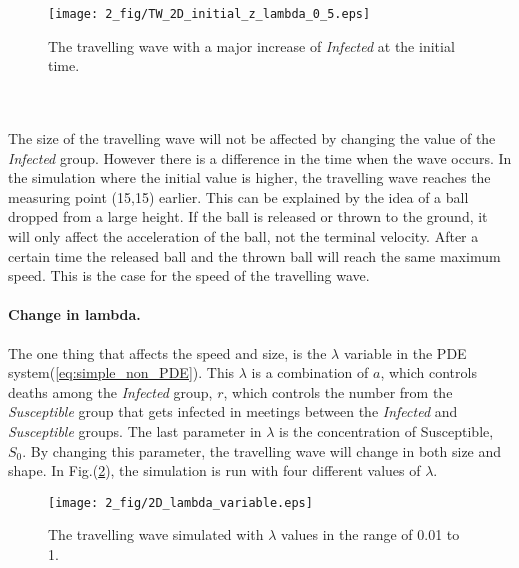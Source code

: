 \documentclass[%
twoside,                 %
final,                   %
chapterprefix=true,      %
open=right               %
10pt]{book}
\begin{document}
\begin{figure}[ht]
  \centerline{\texttt{[image: 2\_fig/TW\_2D\_initial\_z\_lambda\_0\_5.eps]}}
  \caption{
  \label{fig:initial_trav_wave} The travelling wave with a major increase of \emph{Infected} at the initial time.
  }
\end{figure}


\\
\\
The size of the travelling  wave will not be affected by changing the value of the \emph{Infected} group. However there is a difference in the time when the wave occurs. In the simulation where the initial value is higher, the travelling wave reaches the measuring point (15,15) earlier. This can be explained by the idea of a ball dropped from a large height. If the ball is released or thrown to the ground, it will only affect the acceleration of the ball, not the terminal velocity. After a certain time the released ball and the thrown ball will reach the same maximum speed. This is the case for the speed of the travelling wave. 
\paragraph{Change in lambda.}
The one thing that affects the speed and size, is the $\lambda$ variable in the PDE system(\ref{eq:simple_non_PDE}). This $\lambda$ is a combination of $a$, which controls deaths among the \emph{Infected} group, $r$, which controls the number from the \emph{Susceptible} group that gets infected in meetings between the \emph{Infected} and \emph{Susceptible} groups. The last parameter in $\lambda$ is the concentration of Susceptible, $S_0$. By changing this parameter, the travelling wave will change in both size and shape. In Fig.(\ref{fig:change_lambda}), the simulation is run with four different values of $\lambda$.


\begin{figure}[ht]
  \centerline{\texttt{[image: 2\_fig/2D\_lambda\_variable.eps]}}
  \caption{
  \label{fig:change_lambda} The travelling wave simulated with $\lambda$ values in the range of 0.01 to 1.
  }
\end{figure}
\end{document}

